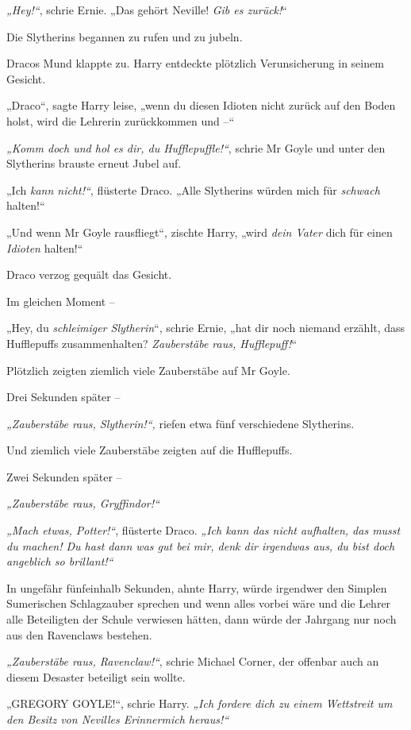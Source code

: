 {\emph{„Hey!“}, schrie Ernie. „Das gehört Neville! \emph{Gib es zurück!}“

Die Slytherins begannen zu rufen und zu jubeln.

Dracos Mund klappte zu. Harry entdeckte plötzlich Verunsicherung in seinem Gesicht.

„Draco“, sagte Harry leise, „wenn du diesen Idioten nicht zurück auf den Boden holst, wird die Lehrerin zurückkommen und --“

\emph{„Komm doch und hol es dir, du Hufflepuffle!“}, schrie Mr Goyle und unter den Slytherins brauste erneut Jubel auf.

„Ich \emph{kann nicht!“}, flüsterte Draco. „Alle Slytherins würden mich für \emph{schwach} halten!“

„Und wenn Mr Goyle rausfliegt“, zischte Harry, „wird \emph{dein Vater} dich für einen \emph{Idioten} halten!“

Draco verzog gequält das Gesicht.

Im gleichen Moment --

„Hey, du \emph{schleimiger Slytherin}“, schrie Ernie, „hat dir noch niemand erzählt, dass Hufflepuffs zusammenhalten? \emph{Zauberstäbe raus, Hufflepuff!}“

Plötzlich zeigten ziemlich viele Zauberstäbe auf Mr Goyle.

Drei Sekunden später --

\emph{„Zauberstäbe raus, Slytherin!“,} riefen etwa fünf verschiedene Slytherins.

Und ziemlich viele Zauberstäbe zeigten auf die Hufflepuffs.

Zwei Sekunden später --

\emph{„Zauberstäbe raus, Gryffindor!“}

\emph{„Mach etwas, Potter!“}, flüsterte Draco. \emph{„Ich kann das nicht aufhalten, das musst du machen! Du hast dann was gut bei mir, denk dir irgendwas aus, du bist doch angeblich so brillant!“}

In ungefähr fünfeinhalb Sekunden, ahnte Harry, würde irgendwer den Simplen Sumerischen Schlagzauber sprechen und wenn alles vorbei wäre und die Lehrer alle Beteiligten der Schule verwiesen hätten, dann würde der Jahrgang nur noch aus den Ravenclaws bestehen.

\emph{„Zauberstäbe raus, Ravenclaw!“}, schrie Michael Corner, der offenbar auch an diesem Desaster beteiligt sein wollte.

„GREGORY GOYLE!“, schrie Harry. \emph{„Ich fordere dich zu einem Wettstreit um den Besitz von Nevilles Erinnermich heraus!“}

}
